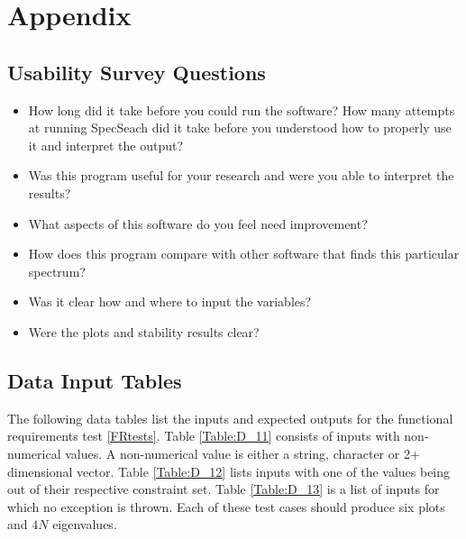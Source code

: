 \documentclass[12pt, titlepage]{article}
\begin{document}
\newpage

\section{Appendix} \label{app}

\subsection{Usability Survey Questions}
\label{UsabilitySurvey}
\begin{itemize}
	\item How long did it take before you could run the software? How many 
	attempts at running SpecSeach did it take before you understood how to 
	properly use it and interpret the output?
	\item Was this program useful for your research and were you able to 
	interpret the results? 
	\item What aspects of this software do you feel need improvement?
	\item How does this program compare with other software that finds this 
	particular spectrum? 
	\item Was it clear how and where to input the variables? 
	\item Were the plots and stability results clear? 
\end{itemize} 

\newpage
\subsection{Data Input Tables} 
\label{datainput}
The following data tables list the inputs and expected outputs for the 
functional requirements test \ref{FRtests}. Table \ref{Table:D_11} consists of 
inputs with non-numerical values. A non-numerical value is either a string, 
character or 2+ dimensional vector. Table \ref{Table:D_12} lists inputs with 
one of the values being out of their respective constraint set. Table 
\ref{Table:D_13} is a list of inputs for which no exception is thrown. Each of 
these test cases should produce six plots and $4N$ eigenvalues. 
\end{document}

